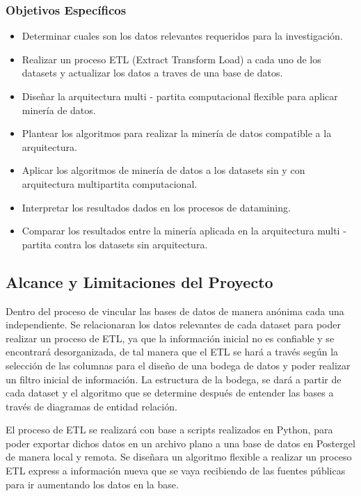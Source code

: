 \documentclass[a4paper, 11pt, oneside]{article}
\theoremstyle{definition}
\theoremstyle{remark}
\begin{document}
\subsubsection{Objetivos Específicos}
\begin{itemize}
\item Determinar cuales son los datos relevantes requeridos para la investigación.
\item Realizar un proceso ETL (Extract Transform Load) a cada uno de los datasets y actualizar los datos a traves de una base de datos.
\item Diseñar la arquitectura multi - partita computacional flexible para aplicar minería de datos.
\item Plantear los algoritmos para realizar la minería de datos compatible a la arquitectura.
\item Aplicar los algoritmos de minería de datos a los datasets sin y con arquitectura multipartita computacional.
\item Interpretar los resultados dados en los procesos de datamining.
\item Comparar los resultados entre la minería aplicada en la arquitectura multi - partita contra los datasets sin arquitectura.

\end{itemize}

\subsection{Alcance y Limitaciones del Proyecto}
Dentro del proceso de vincular las bases de datos de manera anónima cada una independiente. Se relacionaran los datos relevantes de cada dataset para poder realizar un proceso de ETL, ya que la información inicial no es confiable y se encontrará desorganizada, de tal manera que el ETL se hará a través según la selección de las columnas para el diseño de una bodega de datos y poder realizar un filtro inicial de información. La estructura de la bodega, se dará a partir de cada dataset y el algoritmo que se determine después de entender las bases a través de diagramas de entidad relación.

El proceso de ETL se realizará con base a scripts realizados en Python, para poder exportar dichos datos en un archivo plano a una base de datos en Postergel de manera local y remota. Se diseñara un algoritmo flexible a realizar un proceso ETL express a información nueva que se vaya recibiendo de las fuentes públicas para ir aumentando los datos en la base.
\end{document}
